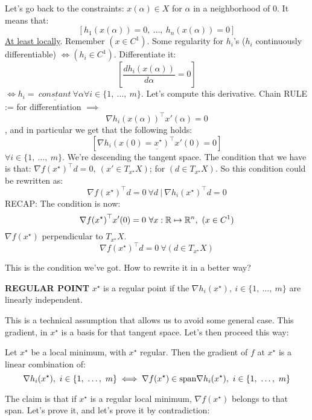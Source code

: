 Let's go back to the constraints: $x(\alpha)\in X$ for $\alpha$ in a neighborhood of 0. It means that:
\[
	[h_1(x(\alpha))=0,\ \dots,\ h_n(x(\alpha)) = 0]
\]
\underline{At least locally}. Remember $(x\in C^1)$. Some regularity for $h_i$'s ($h_i$ continuously differentiable) $\iff (h_i\in C^1)$. Differentiate it:
\[	
	[\frac{dh_i(x(\alpha))}{d\alpha} = 0]
\]
$\iff \underline{h_i =\ constant\ \forall\alpha\forall i}\in\{1,\ \dots,\ m\}$. Let's compute this derivative. Chain RULE := for differentiation $\implies$
\[
	\nabla{h_i(x(\alpha))}^\top x'(\alpha) = 0
\]
, and in particular we get that the following holds:
\[
	[\underline{\nabla{h_i(x(0)=x^\star)}^\top x'(0) = 0}]
\]
$\forall i\in\{1,\ \dots,\ m\}$. We're descending the tangent space. The condition that we have is that: $\nabla{f(x^\star)}^\top d = 0,\ (x'\in T_{x^\star}X)$; for $(d\in T_{x^\star}X)$. So this condition could be rewritten as:
\[
	\nabla{f(x^\star)}^\top d = 0\ \forall d\ |\ \nabla{h_i(x^\star)}^\top d = 0
\]
RECAP: The condition is now:
\[
	\nabla{f(x^\star)}^\top x'(0) = 0\ \forall x:\mathbb{R}\mapsto\mathbb{R}^n,\ (x\in C^1)
\]
$\nabla{f(x^\star)}$ perpendicular to $T_{x^\star}X$.
\[
	\nabla{f(x^\star)}^\top d = 0\ \forall (d\in T_{x^\star}X)
\]

This is the condition we've got. How to rewrite it in a better way?

\begin{defn}{\textbf{REGULAR POINT}} \newline
$x^\star$ is a regular point if the $\nabla{h_i(x^\star)},\ i\in\{1,\ \dots,\ m\}$ are linearly independent.
\end{defn}

This is a technical assumption that allows us to avoid some general case. This gradient, in $x^\star$ is a basis for that tangent space. Let's then proceed this way:

\begin{prop}
Let $x^\star$ be a local minimum, with $x^\star$ regular. Then the gradient of $f$ at $x^\star$ is a linear combination of:
\[
	\nabla{h_i(x^\star)},\ i\in\{1,\ \dots,\ m\} \iff \nabla{f(x^\star)} \in\Span{\nabla{h_i(x^\star)},\ i\in\{1,\ \dots,\ m\}}
\]
\end{prop}

The claim is that if $x^\star$ is a regular local minimum, $\nabla{f(x^\star)}$ belongs to that span. Let's prove it, and let's prove it by contradiction:

